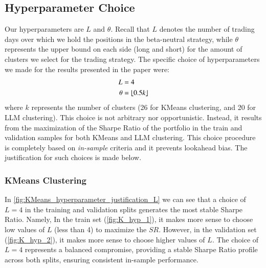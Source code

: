 \subsection{Hyperparameter Choice}
Our hyperparameters are $L$ and $\theta$. Recall that $L$ denotes the number of trading days over which we hold the positions in the beta-neutral strategy, while $\theta$ represents the upper bound on each side (long and short) for the amount of clusters we select for the trading strategy. The specific choice of hyperparameters we made for the results presented in the paper were:
\begin{align*}
L &= 4
\\
\theta &= \lfloor 0.5k \rfloor
\end{align*}
where $k$ represents the number of clusters (26 for KMeans clustering, and 20 for LLM clustering). This choice is not arbitrary nor opportunistic. Instead, it results from the maximization of the Sharpe Ratio of the portfolio in the train and validation samples for both KMeans and LLM clustering. This choice procedure is completely based on \textit{in-sample} criteria and it prevents lookahead bias. The justification for such choices is made below.

\subsubsection{KMeans Clustering}

In \cref{fig:KMeans_hyperparameter_justification_L} we can see that a choice of $L=4$ in the training and validation splits generates the most stable Sharpe Ratio. Namely, In the train set (\cref{fig:K_hyp_1}), it makes more sense to choose low values of $L$ (less than 4) to maximize the $SR$. However, in the validation set (\cref{fig:K_hyp_2}), it makes more sense to choose higher values of $L$. The choice of $L=4$ represents a balanced compromise, providing a stable Sharpe Ratio profile across both splits, ensuring consistent in-sample performance.

